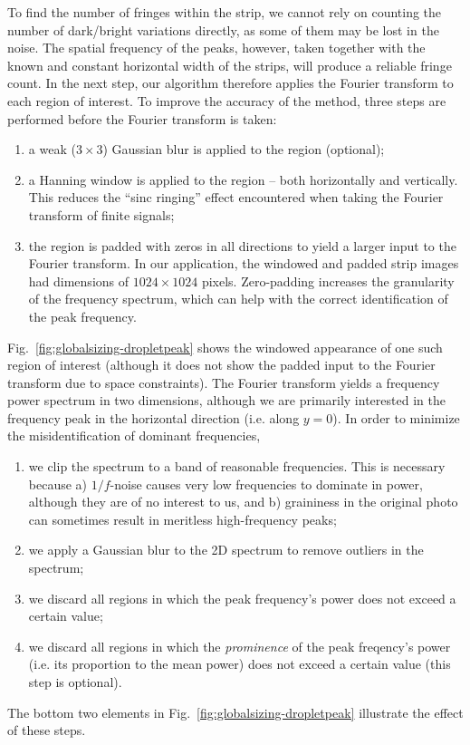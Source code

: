 \documentclass[11.5pt]{book}
\newcommand*{\figref}[1]{Fig.~\ref{#1}}
\begin{document}
To find the number of fringes within the strip, we cannot rely on counting the
number of dark/bright variations directly, as some of them may be lost in the
noise. The spatial frequency of the peaks, however, taken together with the
known and constant horizontal width of the strips, will produce a reliable
fringe count. In the next step, our algorithm therefore applies the Fourier
transform to each region of interest. To improve the accuracy of the method,
three steps are performed before the Fourier transform is taken:
\begin{enumerate}
    \item a weak ($3 \times 3$) Gaussian blur is applied to the region
        (optional);
    \item a Hanning window is applied to the region -- both horizontally and
        vertically. This reduces the ``sinc ringing'' effect encountered when
        taking the Fourier transform of finite signals;
    \item the region is padded with zeros in all directions to yield a larger
        input to the Fourier transform. In our application, the windowed and padded strip
        images had dimensions of $1024 \times 1024$ pixels. Zero-padding
        increases the granularity of the frequency spectrum, which can help with
        the correct identification of the peak frequency.
\end{enumerate}

\figref{fig:globalsizing-dropletpeak} shows the windowed appearance of
one such region of interest (although it does not show the padded input to the
Fourier transform due to space constraints). The Fourier transform yields a
frequency power spectrum in two dimensions, although we are primarily interested
in the frequency peak in the horizontal direction (i.e. along $y=0$). In order
to minimize the misidentification of dominant frequencies,
\begin{enumerate}
    \item we clip the spectrum to a band of reasonable frequencies. This is
        necessary because a) $1/f$-noise causes very low frequencies to dominate
        in power, although they are of no interest to us, and b) graininess in
        the original photo can sometimes result in meritless high-frequency
        peaks;
    \item we apply a Gaussian blur to the 2D spectrum to remove outliers in the
        spectrum;
    \item we discard all regions in which the peak frequency's power does not
        exceed a certain value;
    \item we discard all regions in which the \textit{prominence} of the peak
        freqency's power (i.e. its proportion to the mean power) does not exceed
        a certain value (this step is optional).
\end{enumerate}
The bottom two elements in \figref{fig:globalsizing-dropletpeak} illustrate
the effect of these steps.
\end{document}
